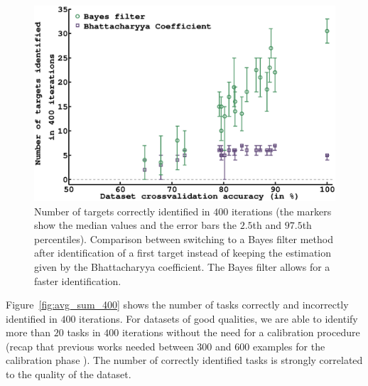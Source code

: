 \documentclass[letterpaper]{article}
\newcommand{\ww}{0.9}
\begin{document}
\begin{figure}[!ht]
    \centering
        \includegraphics[width=\ww\columnwidth]{img/plot_bhattha_vs_bayes}
        \caption{Number of targets correctly identified in $400$ iterations (the markers show the median values and the error bars the $2.5$th and $97.5$th percentiles). Comparison between switching to a Bayes filter method after identification of a first target instead of keeping the estimation given by the Bhattacharyya coefficient. The Bayes filter allows for a faster identification.}
        \label{fig:bhatta}
\end{figure} 

Figure~\ref{fig:avg_sum_400} shows the number of tasks correctly and incorrectly identified in $400$ iterations. For datasets of good qualities, we are able to identify more than $20$ tasks in $400$ iterations without the need for a calibration procedure (recap that previous works needed between 300 and 600 examples for the calibration phase \cite{chavarriaga2010learning,iturrate2010single}). The number of correctly identified tasks is strongly correlated to the quality of the dataset.
\end{document}

